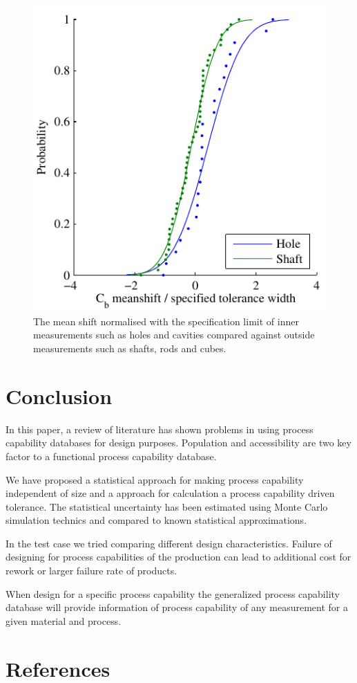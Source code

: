 \documentclass[aip,amsmath, reprint, author-year]{revtex4-1}
\begin{document}
\begin{figure}
\includegraphics{Cb_holeshaft.pdf}
\caption{\label{fig:Cb_holeshaft} The mean shift normalised with the specification limit of inner measurements such as holes and cavities compared against outside measurements such as shafts, rods and cubes. }
\end{figure}



\section{Conclusion}
In this paper, a review of literature has shown problems in using process capability databases for design purposes. Population and accessibility are two key factor to a functional process capability database.

We have proposed a statistical approach for making process capability independent of size and a approach for calculation a process capability driven tolerance. The statistical uncertainty has been estimated using Monte Carlo simulation technics and compared to known statistical approximations.

In the test case we tried comparing different design characteristics.
Failure of designing for process capabilities of the production can lead to additional cost for rework or larger failure rate of products. 

When design for a specific process capability the generalized process capability database will provide information of process capability of any measurement for a given material and process.

\section*{References}

\end{document}
